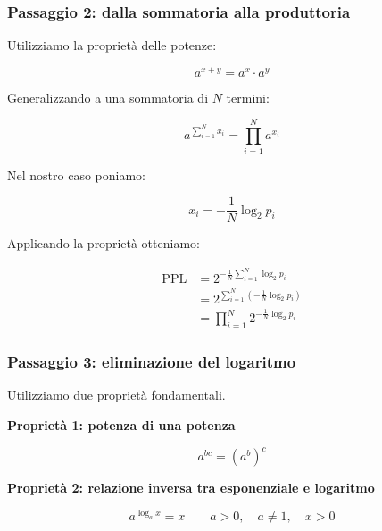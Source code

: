 \subsubsection*{Passaggio 2: dalla sommatoria alla produttoria}

Utilizziamo la proprietà delle potenze:

\begin{equation}
    \boxed{a^{x+y}=a^x\cdot a^y}
\end{equation}

Generalizzando a una sommatoria di $N$ termini:

\begin{equation}
    \boxed{
        a^{\sum_{i=1}^{N}x_i}
        = \prod_{i=1}^{N}a^{x_i}
    }
\end{equation}

Nel nostro caso poniamo:

\begin{equation}
    x_i = -\frac{1}{N}\log_2 p_i
\end{equation}

Applicando la proprietà otteniamo:

\begin{equation}
    \begin{aligned}
        \mathrm{PPL}
        &= 2^{-\frac{1}{N}
            \sum_{i=1}^{N}\log_2 p_i}\\[6pt]
        &= 2^{\sum_{i=1}^{N}
            \left(-\frac{1}{N}\log_2 p_i\right)}\\[6pt]
        &= \prod_{i=1}^{N}
            2^{-\frac{1}{N}\log_2 p_i}
    \end{aligned}
\end{equation}

\subsubsection*{Passaggio 3: eliminazione del logaritmo}

Utilizziamo due proprietà fondamentali.

\textbf{Proprietà 1: potenza di una potenza}

\begin{equation}
    \boxed{a^{bc}=(a^b)^c}
\end{equation}

\textbf{Proprietà 2: relazione inversa tra
esponenziale e logaritmo}

\begin{equation}
    \boxed{a^{\log_a x}=x}
    \qquad a>0,\quad a\neq 1,\quad x>0
\end{equation}

